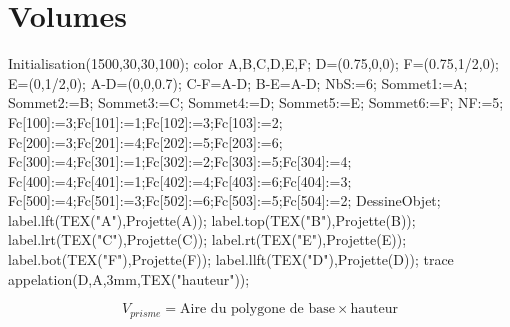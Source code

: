 \section{Volumes}
    \begin{propriete}
        \begin{minipage}{0.2\linewidth}
            \begin{Geometrie}[CoinBG={u*(-10,-10)},TypeTrace="Espace"]
                Initialisation(1500,30,30,100);
                color A,B,C,D,E,F;
                D=(0.75,0,0);
                F=(0.75,1/2,0);
                E=(0,1/2,0);
                A-D=(0,0,0.7);
                C-F=A-D;
                B-E=A-D;
                NbS:=6;
                Sommet1:=A;
                Sommet2:=B;
                Sommet3:=C;
                Sommet4:=D;
                Sommet5:=E;
                Sommet6:=F;
                NF:=5;
                Fc[100]:=3;Fc[101]:=1;Fc[102]:=3;Fc[103]:=2;
                Fc[200]:=3;Fc[201]:=4;Fc[202]:=5;Fc[203]:=6;
                Fc[300]:=4;Fc[301]:=1;Fc[302]:=2;Fc[303]:=5;Fc[304]:=4;
                Fc[400]:=4;Fc[401]:=1;Fc[402]:=4;Fc[403]:=6;Fc[404]:=3;
                Fc[500]:=4;Fc[501]:=3;Fc[502]:=6;Fc[503]:=5;Fc[504]:=2;
                DessineObjet;
                label.lft(TEX("A"),Projette(A));
                label.top(TEX("B"),Projette(B));
                label.lrt(TEX("C"),Projette(C));
                label.rt(TEX("E"),Projette(E));
                label.bot(TEX("F"),Projette(F));
                label.llft(TEX("D"),Projette(D));
                trace appelation(D,A,3mm,TEX("hauteur"));
            \end{Geometrie}
        \end{minipage}
        \hfill
        \begin{minipage}{0.75\linewidth}
            $$V_{prisme}=\text{Aire du polygone de base}\times \text{hauteur}$$
        \end{minipage}
    \end{propriete}
